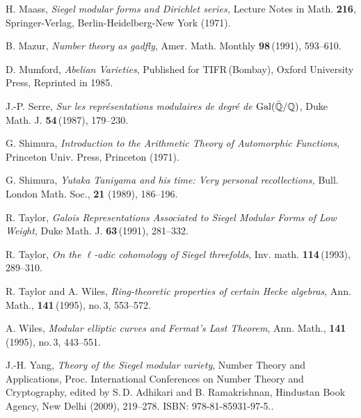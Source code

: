 \documentclass[11pt]{amsart}
\begin{document}
\begin{thebibliography}{99}
 H. Maass, {\em Siegel modular forms and Dirichlet series,} Lecture Notes in Math. {\bf 216}, Springer-Verlag, Berlin-Heidelberg-New York (1971).

 B. Mazur, {\em Number theory as gadfly}, Amer. Math. Monthly
{\bf 98}\,(1991), 593--610.

 D. Mumford, {\em Abelian Varieties}, Published for TIFR\,(Bombay), Oxford
University Press, Reprinted in 1985.

 J.-P. Serre, {\em Sur les repr{\' e}sentations modulaires de degr{\'e} de
${\rm Gal}(\bar{\mathbb Q} /\mathbb Q)$}, Duke Math. J. {\bf 54}\,(1987), 179--230.


 G. Shimura, {\em Introduction to the Arithmetic Theory of Automorphic
Functions}, Princeton Univ. Press, Princeton (1971).

 G. Shimura, {\em Yutaka Taniyama and his time: Very personal recollections,}
Bull. London Math. Soc., {\bf 21} (1989), 186--196.

 R. Taylor, {\em Galois Representations Associated to Siegel Modular Forms
of Low Weight}, Duke Math. J. {\bf 63}\,(1991), 281--332.

 R. Taylor, {\em On the $\ell$-adic cohomology of Siegel threefolds},
Inv. math. {\bf 114}\,(1993), 289--310.

 R. Taylor and A. Wiles, {\em Ring-theoretic properties of certain Hecke
algebras}, Ann. Math., {\bf 141}\,(1995), no.\,3, 553--572.

 A. Wiles, {\em Modular elliptic curves and Fermat's Last Theorem},
Ann. Math., {\bf 141}\,(1995), no.\,3, 443--551.

 J.-H. Yang, {\em Theory of the Siegel modular variety}, Number Theory and
Applications, Proc. International Conferences on Number Theory and Cryptography, edited by
S.\,D. Adhikari and B. Ramakrishnan, Hindustan Book Agency, New Delhi (2009), 219--278.
ISBN: 978-81-85931-97-5..

\end{thebibliography}
\end{document}
